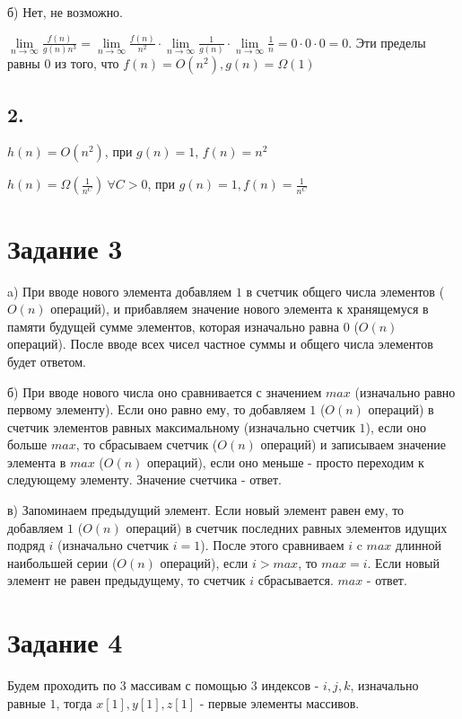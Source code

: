 \documentclass[a4paper,12pt]{article}
\begin{document}
б) Нет, не возможно.

$\lim\limits_{n\to\infty}\frac{f(n)}{g(n)n^{3}}=\lim\limits_{n\to\infty}\frac{f(n)}{n^{2}}\cdot\lim\limits_{n\to\infty}\frac{1}{g(n)}\cdot\lim\limits_{n\to\infty}\frac{1}{n}=0\cdot0\cdot0=0$. Эти пределы равны $0$ из того, что $f(n) = O\left( n^{2}\right) , g(n) = \Omega(1)$

\subsection*{2.}
\hspace{0.5cm}
$h(n)=O\left( n^{2}\right) $, при $g(n)=1$, $f(n)=n^{2}$

$h(n)=\Omega\left( \frac{1}{n^{C}}\right) \ \forall C>0$, при $g(n)=1, f(n)=\frac{1}{n^{C}}$

\section*{Задание 3}
a) При вводе нового элемента добавляем $1$ в счетчик общего числа элементов ($O(n)$ операций), и прибавляем значение нового элемента к хранящемуся в памяти будущей сумме элементов, которая изначально равна $0$ ($O(n)$ операций). После вводе всех чисел частное суммы и общего числа элементов будет ответом.

б) При вводе нового числа оно сравнивается с значением $max$ (изначально равно первому элементу). Если оно равно ему, то добавляем $1$ ($O(n)$ операций) в счетчик элементов равных максимальному (изначально счетчик $1$), если оно больше $max$, то сбрасываем счетчик ($O(n)$ операций) и записываем значение элемента в $max$ ($O(n)$ операций), если оно меньше - просто переходим к следующему элементу. Значение счетчика - ответ.

в) Запоминаем предыдущий элемент. Если новый элемент равен ему, то добавляем $1$ ($O(n)$ операций) в счетчик последних равных элементов идущих подряд $i$ (изначально счетчик $i=1$). После этого сравниваем $i$ c $max$ длинной наибольшей серии ($O(n)$ операций), если $i>max$, то $max=i$. Если новый элемент не равен предыдущему, то счетчик $i$ сбрасывается. $max$ - ответ.

\section*{Задание 4}
\hspace{0.5cm}
Будем проходить по 3 массивам с помощью 3 индексов - $i,j,k$, изначально равные $1$, тогда $x[1], y[1], z[1]$ - первые элементы массивов.
\end{document}
